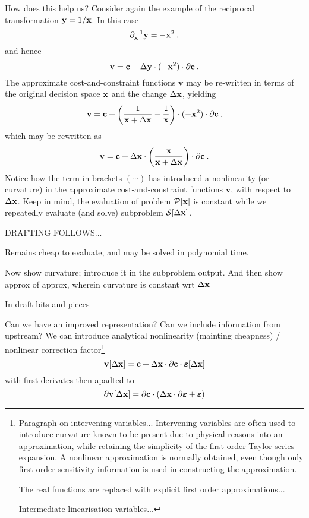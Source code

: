 \documentclass[11pt]{article}
\begin{document}
How does this help us? Consider again the example of the reciprocal transformation $\mathbf{y} = 1/ \mathbf{x}$. In this case
\begin{equation}
\partial_{\mathbf{x}}^{-1} \mathbf{y} = - \mathbf{x}^2 \: ,
\end{equation}
and hence
\begin{equation}
    \textbf{v} = \mathbf{c} + \Delta \mathbf{y} \cdot (-\mathbf{x}^2) \cdot \partial \mathbf{c} \:.
\end{equation}
The approximate cost-and-constraint functions $\textbf{v}$ may be re-written in terms of the original decision space $\mathbf{x}$ and the change $\Delta \mathbf{x}$, yielding
\begin{equation}
    \textbf{v} = \mathbf{c} + \left( \frac{1}{ \mathbf{x} + \Delta\mathbf{x}} - \frac{1}{\mathbf{x}} \right) \cdot (-\mathbf{x}^2) \cdot \partial \mathbf{c} \:,
\end{equation}
which may be rewritten as
\begin{equation}
    \textbf{v} = \mathbf{c} + \Delta \mathbf{x} \cdot \left( \frac{\mathbf{x}}{\mathbf{x} + \Delta \mathbf{x}} \right) \cdot \partial \mathbf{c} \:.
\end{equation}
Notice how the term in brackets $(\cdots)$ has introduced a nonlinearity (or curvature) in the approximate cost-and-constraint functions $\textbf{v}$, with respect to $\Delta \mathbf{x}$. Keep in mind, the evaluation of problem $\mathcal{P} [\mathbf{x}]$ is constant while we repeatedly evaluate (and solve) subproblem $\mathcal{S}[\Delta \mathbf{x}]$. 

\bigskip

DRAFTING FOLLOWS...

\bigskip

Remains cheap to evaluate, and may be solved in polynomial time.

Now show curvature; introduce it in the subproblem output. And then show approx of approx, wherein curvature is constant wrt $\Delta \mathbf{x}$

\newpage

In draft bits and pieces

Can we have an improved representation? Can we include information from upstream? We can introduce analytical nonlinearity (mainting cheapness) / nonlinear correction factor\footnote{Paragraph on intervening variables... Intervening variables are often used to introduce curvature known to be present due to physical reasons into an approximation, while retaining the simplicity of the first order Taylor series expansion. A nonlinear
approximation is normally obtained, even though only
first order sensitivity information is used in constructing the approximation. 

The real functions are replaced with explicit first order approximations...

Intermediate linearisation variables...

}
\begin{equation}
\textbf{v}[\Delta \mathbf{x}] = \mathbf{c} + \Delta \mathbf{x} \cdot \partial \mathbf{c} \cdot \bm{\varepsilon}[\Delta \mathbf{x}]
\end{equation}
with first derivates then apadted to 
\begin{equation}
\partial \textbf{v}[\Delta \mathbf{x}] = \partial \mathbf{c} \cdot ( \Delta \mathbf{x} \cdot \partial \bm{\varepsilon} + \bm{\varepsilon})
\end{equation}
\end{document}
